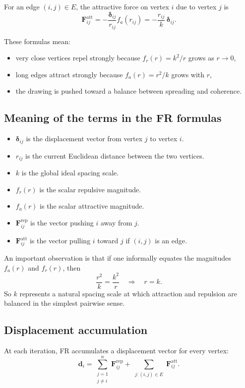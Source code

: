 \documentclass[11pt]{article}
\newcommand{\vect}[1]{\boldsymbol{#1}}
\begin{document}
For an edge $(i,j) \in E$, the attractive force on vertex $i$ due to vertex $j$
is
\[
\vect{F}^{\text{att}}_{ij}
=
-
\frac{\vect{\delta}_{ij}}{r_{ij}} f_a(r_{ij})
=
-
\frac{r_{ij}}{k}\,\vect{\delta}_{ij}.
\]

These formulas mean:
\begin{itemize}[leftmargin=1.5em]
\item very close vertices repel strongly because $f_r(r) = k^2/r$ grows as $r \to 0$,
\item long edges attract strongly because $f_a(r) = r^2/k$ grows with $r$,
\item the drawing is pushed toward a balance between spreading and coherence.
\end{itemize}

\subsection{Meaning of the terms in the FR formulas}

\begin{itemize}[leftmargin=1.5em]
\item $\vect{\delta}_{ij}$ is the displacement vector from vertex $j$ to vertex $i$.
\item $r_{ij}$ is the current Euclidean distance between the two vertices.
\item $k$ is the global ideal spacing scale.
\item $f_r(r)$ is the scalar repulsive magnitude.
\item $f_a(r)$ is the scalar attractive magnitude.
\item $\vect{F}^{\text{rep}}_{ij}$ is the vector pushing $i$ away from $j$.
\item $\vect{F}^{\text{att}}_{ij}$ is the vector pulling $i$ toward $j$ if $(i,j)$ is an edge.
\end{itemize}

An important observation is that if one informally equates the magnitudes
$f_a(r)$ and $f_r(r)$, then
\[
\frac{r^2}{k} = \frac{k^2}{r}
\quad \Longrightarrow \quad
r = k.
\]
So $k$ represents a natural spacing scale at which attraction and repulsion are
balanced in the simplest pairwise sense.

\subsection{Displacement accumulation}

At each iteration, FR accumulates a displacement vector for every vertex:
\[
\vect{d}_i =
\sum_{\substack{j=1 \\ j \ne i}}^n \vect{F}^{\text{rep}}_{ij}
+
\sum_{\substack{j:(i,j)\in E}} \vect{F}^{\text{att}}_{ij}.
\]
\end{document}
